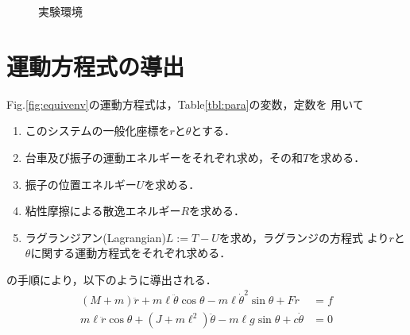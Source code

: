 \begin{figure}[!ht]
 \begin{center}
  \caption{実験環境}
  \label{fig:expenv}
 \end{center}
\end{figure}
\section{運動方程式の導出}
Fig.\ref{fig:equivenv}の運動方程式は，Table\ref{tbl:para}の変数，定数を
用いて
\begin{enumerate}
 \item このシステムの一般化座標を$r$と$\theta$とする．
 \item 台車及び振子の運動エネルギーをそれぞれ求め，その和$T$を求める．
 \item 振子の位置エネルギー$U$を求める．
 \item 粘性摩擦による散逸エネルギー$R$を求める．
 \item ラグランジアン(Lagrangian)$L := T - U$を求め，ラグランジの方程式
       より$r$と$\theta$に関する運動方程式をそれぞれ求める．
\end{enumerate}
の手順により，以下のように導出される．
\begin{align*}
 (M + m)\ddot{r} + m\ell\ddot{\theta}\cos\theta
  - m\ell\dot{\theta}^2\sin\theta + F\dot{r} &= f \\
 m\ell\ddot{r}\cos\theta + (J + m\ell^2)\ddot{\theta}
  - m\ell g \sin\theta + c\dot{\theta} &= 0
\end{align*}

